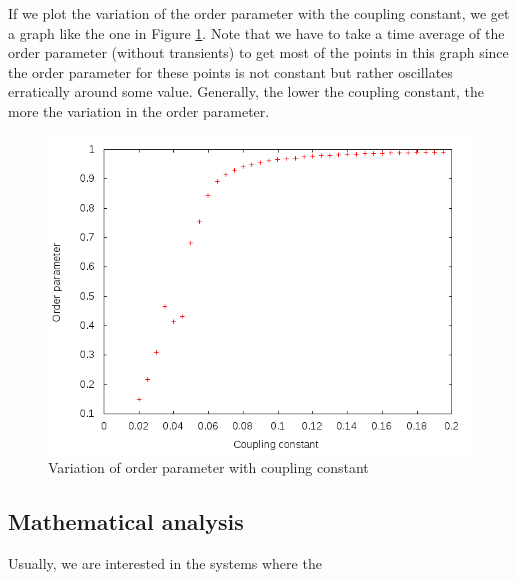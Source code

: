 \documentclass[12pt]{article}
\begin{document}
If we plot the variation of the order parameter with the coupling constant, we get a graph like the one in Figure \ref{fig:plot:ovc}. Note that we have to take a time average of the order parameter (without transients) to get most of the points in this graph since the order parameter for these points is not constant but rather oscillates erratically around some value. Generally, the lower the coupling constant, the more the variation in the order parameter.

\begin{figure}
\centering
\includegraphics[scale=0.5]{data/ovcoupling}
\caption{Variation of order parameter with coupling constant}
\label{fig:plot:ovc}
\end{figure}



\subsection{Mathematical analysis}

Usually, we are interested in the systems where the
\end{document}
